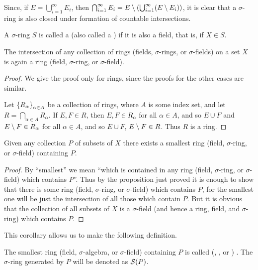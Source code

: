 Since, if $E=\bigcup_{i=1}^\infty E_i$, then $\bigcap_{i=1}^\infty E_i=E\setminus\left(\bigcup_{i=1}^\infty(E\setminus E_i)\right)$, it is clear that a $\sigma$-ring is also closed under formation of countable intersections.

\begin{definition}
A $\sigma$-ring $S$ is called a  (also called a ) if it is also a field, that is, if $X\in S$. 
\end{definition}

\begin{proposition}
The intersection of any collection of rings (fields, $\sigma$-rings, or $\sigma$-fields) on a set $X$ is again a ring (field, $\sigma$-ring, or $\sigma$-field).
\end{proposition}
\begin{proof}
We give the proof only for rings, since the proofs for the other cases are similar.

Let $\left\{R_\alpha\right\}_{\alpha\in A}$ be a collection of rings, where $A$ is some index set, and let $R =\bigcap_{\alpha\in A}R_\alpha$. If $E,F\in R$, then $E,F\in R_\alpha$ for all $\alpha\in A$, and so $E\cup F$ and $E\setminus F\in R_\alpha$ for all $\alpha\in A$, and so $E\cup F$, $E\setminus F\in R$. Thus $R$ is a ring.
\end{proof}

\begin{corollary}
Given any collection $P$ of subsets of $X$ there exists a smallest ring (field, $\sigma$-ring, or $\sigma$-field) containing $P$.
\end{corollary}
\begin{proof}
By ``smallest'' we mean ``which is contained in any ring (field, $\sigma$-ring, or $\sigma$-field) which contains $P$''. Thus by the proposition just proved it is enough to show that there is some ring (field, $\sigma$-ring, or $\sigma$-field) which contains $P$, for the smallest one will be just the intersection of all those which contain $P$. But it is obvious that the collection of all subsets of $X$ is a $\sigma$-field (and hence a ring, field, and $\sigma$-ring) which contains $P$.
\end{proof}

This corollary allows us to make the following definition.

\begin{definition}\label{def:generate sets}
The smallest ring (field, $\sigma$-algebra, or $\sigma$-field) containing $P$ is called  (, , or )  . The $\sigma$-ring generated by $P$ will be denoted as ${\cal S}(P)$.
\end{definition}

